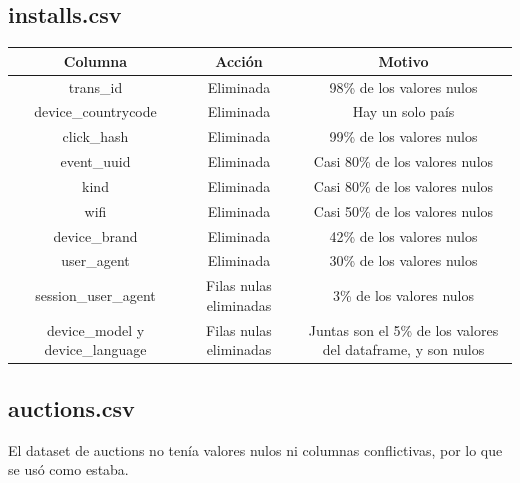 \documentclass{article}
\begin{document}
\subsection{installs.csv}
\FloatBarrier
\begin{center}
        \begin{tabular}{ |c|c|c| }
          \hline
          Columna & Acción & Motivo \\
          \hline\hline
          trans\_id & Eliminada & 98\% de los valores nulos \\
          \hline
          device\_countrycode & Eliminada & Hay un solo país \\
          \hline
          click\_hash & Eliminada & 99\% de los valores nulos \\
          \hline
          event\_uuid & Eliminada & Casi 80\% de los valores nulos \\
          \hline
          kind & Eliminada & Casi 80\% de los valores nulos \\
          \hline
          wifi & Eliminada & Casi 50\% de los valores nulos \\
          \hline
          device\_brand & Eliminada & 42\% de los valores nulos \\
          \hline
          user\_agent & Eliminada & 30\% de los valores nulos \\
          \hline
          session\_user\_agent & Filas nulas eliminadas & 3\% de los valores nulos \\
          \hline
          device\_model y device\_language & Filas nulas eliminadas & Juntas son el 5\% de los valores del dataframe, y son nulos \\
          \hline
        \end{tabular}
\end{center}
\FloatBarrier

\subsection{auctions.csv}
    El dataset de auctions no tenía valores nulos ni columnas conflictivas, por lo que se usó como estaba.
\end{document}
